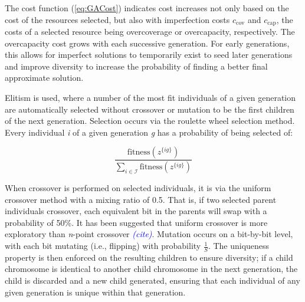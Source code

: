 \documentclass[onecolumn,draftcls]{IEEEtran}
\begin{document}

The cost function (\ref{eq:GACost}) indicates cost increases not only based on the cost of the resources selected, but also with imperfection costs $c_\text{cov}$ and $c_\text{cap}$, the costs of a selected resource being overcoverage or overcapacity, respectively.  The overcapacity cost grows with each successive generation.  For early generations, this allows for imperfect solutions to temporarily exist to seed later generations and improve diversity to increase the probability of finding a better final approximate solution.  %

Elitism is used, where a number of the most fit individuals of a given generation are automatically selected without crossover or mutation to be the first children of the next generation.  Selection occurs via the roulette wheel selection method.  Every individual \textit{i} of a given generation \textit{g} has a probability of being selected of:


\[
\frac{\text{fitness}\left( z^{\{ig\}} \right)}{\sum_{i \in \mathcal{I}} \text{fitness}\left( z^{\{ig\}} \right)}
\]

When crossover is performed on selected individuals, it is via the uniform crossover method with a mixing ratio of 0.5.  That is, if two selected parent individuals crossover, each equivalent bit in the parents will swap with a probability of 50\%.  It has been suggested that uniform crossover is more exploratory than \textit{n}-point crossover \textcolor{blue}{\textit{(cite)}}.  Mutation occurs on a bit-by-bit level, with each bit mutating (i.e., flipping) with probability $\frac{1}{S}$.  The uniqueness property is then enforced on the resulting children to ensure diversity; if a child chromosome is identical to another child chromosome in the next generation, the child is discarded and a new child generated, ensuring that each individual of any given generation is unique within that generation.

\end{document}
